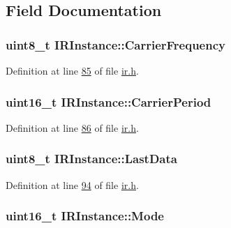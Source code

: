 \subsection{Field Documentation}
\hypertarget{struct_i_r_instance_a23a3063e6f24eaca78f9e0db2f3bd07f}{
\subsubsection[{Carrier\-Frequency}]{\setlength{\rightskip}{0pt plus 5cm}uint8\-\_\-t I\-R\-Instance\-::\-Carrier\-Frequency}}\label{struct_i_r_instance_a23a3063e6f24eaca78f9e0db2f3bd07f}


Definition at line \hyperlink{ir_8h_source_l00085}{85} of file \hyperlink{ir_8h_source}{ir.\-h}.

\hypertarget{struct_i_r_instance_a7ce4e156e8b335f4ab8da1ab95e8bb78}{
\subsubsection[{Carrier\-Period}]{\setlength{\rightskip}{0pt plus 5cm}uint16\-\_\-t I\-R\-Instance\-::\-Carrier\-Period}}\label{struct_i_r_instance_a7ce4e156e8b335f4ab8da1ab95e8bb78}


Definition at line \hyperlink{ir_8h_source_l00086}{86} of file \hyperlink{ir_8h_source}{ir.\-h}.

\hypertarget{struct_i_r_instance_a5d62b35c44888dcb86452195478269fe}{
\subsubsection[{Last\-Data}]{\setlength{\rightskip}{0pt plus 5cm}uint8\-\_\-t I\-R\-Instance\-::\-Last\-Data}}\label{struct_i_r_instance_a5d62b35c44888dcb86452195478269fe}


Definition at line \hyperlink{ir_8h_source_l00094}{94} of file \hyperlink{ir_8h_source}{ir.\-h}.

\hypertarget{struct_i_r_instance_a08ae347b1b1741d54a0e1472bebe0c41}{
\subsubsection[{Mode}]{\setlength{\rightskip}{0pt plus 5cm}uint16\-\_\-t I\-R\-Instance\-::\-Mode}}\label{struct_i_r_instance_a08ae347b1b1741d54a0e1472bebe0c41}


